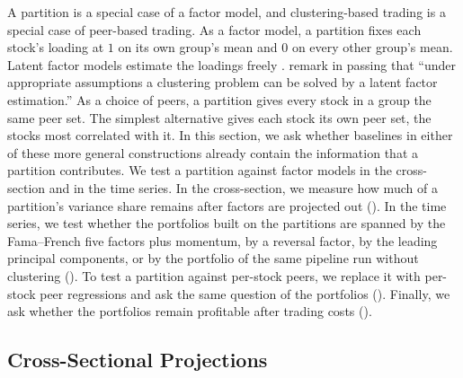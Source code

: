 A partition is a special case of a factor model, and clustering-based trading is a special case of peer-based trading. As a factor model, a partition fixes each stock's loading at $1$ on its own group's mean and $0$ on every other group's mean. Latent factor models estimate the loadings freely \citep{fan2013large}. \citet{guijarro2025deep} remark in passing that ``under appropriate assumptions a clustering problem can be solved by a latent factor estimation.'' As a choice of peers, a partition gives every stock in a group the same peer set. The simplest alternative gives each stock its own peer set, the stocks most correlated with it. In this section, we ask whether baselines in either of these more general constructions already contain the information that a partition contributes. We test a partition against factor models in the cross-section and in the time series. In the cross-section, we measure how much of a partition's variance share remains after factors are projected out (). In the time series, we test whether the portfolios built on the partitions are spanned by the Fama--French five factors plus momentum, by a reversal factor, by the leading principal components, or by the portfolio of the same pipeline run without clustering (). To test a partition against per-stock peers, we replace it with per-stock peer regressions and ask the same question of the portfolios (). Finally, we ask whether the portfolios remain profitable after trading costs ().

\subsection{Cross-Sectional Projections}
\label{sec:lens}

